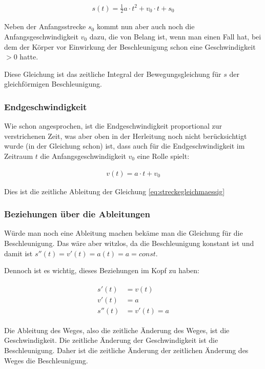 \begin{align} \label{eq:streckegleichmaessig}
	s(t) = \frac{1}{2}a \cdot t^2 + v_0 \cdot t + s_0
\end{align}

\noindent Neben der Anfangsstrecke $s_0$ kommt nun aber auch noch die Anfangsgeschwindigkeit $v_0$ dazu, die von Belang ist, wenn man einen Fall hat, bei dem der Körper vor Einwirkung der Beschleunigung schon eine Geschwindigkeit $>0$ hatte.

\begin{NiceToKnow}
	Diese Gleichung ist das zeitliche Integral der Bewegungsgleichung für $s$ der gleichförmigen Beschleunigung.
\end{NiceToKnow}


\subsubsection{Endgeschwindigkeit}

Wie schon angesprochen, ist die Endgeschwindigkeit proportional zur verstrichenen Zeit, was aber oben in der Herleitung noch nicht berücksichtigt wurde (in der Gleichung schon) ist, dass auch für die Endgeschwindigkeit im Zeitraum $t$ die Anfangsgeschwindigkeit $v_0$ eine Rolle spielt:

\begin{align}	\label{eq:geschwindigkeitgleichmaessig}
	v(t) = a \cdot t + v_0
\end{align}

\noindent Dies ist die zeitliche Ableitung der Gleichung \ref{eq:streckegleichmaessig}


\subsubsection{Beziehungen über die Ableitungen}

Würde man noch eine Ableitung machen bekäme man die Gleichung für die Beschleunigung. Das wäre aber witzlos, da die Beschleunigung konstant ist und damit ist $s''(t)=v'(t)=a(t)=a= const$.

Dennoch ist es wichtig, dieses Beziehungen im Kopf zu haben:

\begin{align}
\begin{split}
	s'(t) &= v(t) \\
	v'(t) &= a \\
	s''(t) &= v'(t)= a
\end{split}
\end{align}

\noindent Die Ableitung des Weges, also die zeitliche Änderung des Weges, ist die Geschwindigkeit. Die zeitliche Änderung der Geschwindigkeit ist die Beschleunigung. Daher ist die zeitliche Änderung der zeitlichen Änderung des Weges die Beschleunigung.



